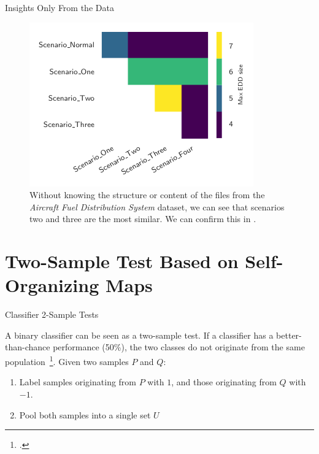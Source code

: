 \documentclass[10pt]{beamer}
\begin{document}
\begin{frame}{Insights Only From the Data}
\begin{figure}
    \centering
    \includegraphics[width=.6\textwidth]{aircraft-cross}
    \caption{
        Without knowing the structure or content of the files from the \emph{Aircraft Fuel Distribution System}
        dataset, we can see that scenarios two and three are the most similar. We can confirm this in
        \cite{Gheraibia2019}.
    }
\end{figure}
\end{frame}

\section{Two-Sample Test Based on Self-Organizing Maps}


\begin{frame}{Classifier 2-Sample Tests}
    \begin{block}{}
        A binary classifier can be seen as a two-sample test.
        If a classifier has a better-than-chance performance (50\%), the two classes do not originate from the same
        population~\footcite{friedman2004multivariate}.
        \smallskip
        Given two samples $P$ and $Q$:
        \begin{enumerate}
            \item Label samples originating from $P$ with $1$, and those originating from $Q$ with $-1$.
            \item Pool both samples into a single set $U$
        \end{enumerate}
    \end{block}
\end{frame}
\end{document}
